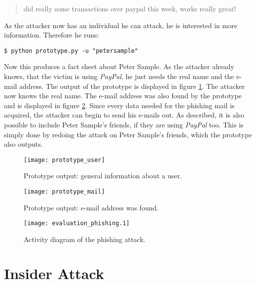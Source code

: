 \begin{quote}
did really some transactions over paypal this week, works really great!
\end{quote}

As the attacker now has an individual he can attack, he is interested in more
information. Therefore he runs:

\lstset{language=bash}
\begin{lstlisting}
$ python prototype.py -u "petersample"
\end{lstlisting}

Now this produces a fact sheet about Peter Sample. As the attacker already
knows, that the victim is using \textit{PayPal}, he just needs the real name
and the e-mail address. The output of the prototype is displayed in figure
\ref{fig:prototype_user}. The attacker now knows the real name. The e-mail
address was also found by the prototype and is displayed in figure
\ref{fig:prototype_mail}. Since every data needed for the phishing mail is
acquired, the attacker can begin to send his e-mails out. As described,
it is also possible to include Peter Sample's friends, if they are using
\textit{PayPal} too. This is simply done by redoing the attack on Peter
Sample's friends, which the prototype also outputs.

\begin{figure}[htb]
  \begin{center}
    \texttt{[image: prototype\_user]}
    \caption{Prototype output: general information about a user.}
    \label{fig:prototype_user}
  \end{center}
\end{figure}

\begin{figure}[htb]
  \begin{center}
    \texttt{[image: prototype\_mail]}
    \caption{Prototype output: e-mail address was found.}
    \label{fig:prototype_mail}
  \end{center}
\end{figure}

\begin{figure}[ht]
  \begin{center}
    \texttt{[image: evaluation\_phishing.1]}
    \label{fig:evaluation_phishing}
    \caption{Activity diagram of the phishing attack.}
  \end{center}
\end{figure}

\section{Insider Attack}

